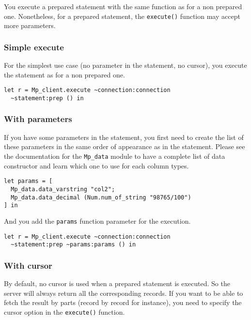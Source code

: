 \documentclass[a4paper, english, 11pt]{article}
\begin{document}
You execute a prepared statement with the same function as for a non prepared one. Nonetheless, for a prepared statement, the \texttt{execute()} function may accept more parameters.

\subsubsection{Simple execute}

For the simplest use case (no parameter in the statement, no cursor), you execute the statement as for a non prepared one.

\begin{verbatim}
let r = Mp_client.execute ~connection:connection
  ~statement:prep () in
\end{verbatim}

\subsubsection{With parameters}

If you have some parameters in the statement, you first need to create the list of these parameters in the same order of appearance as in the statement. Please see the documentation for the \texttt{Mp\_data} module to have a complete list of data constructor and learn which one to use for each column types.

\begin{verbatim}
let params = [
  Mp_data.data_varstring "col2";
  Mp_data.data_decimal (Num.num_of_string "98765/100")
] in
\end{verbatim}

And you add the \texttt{params} function parameter for the execution.

\begin{verbatim}
let r = Mp_client.execute ~connection:connection
  ~statement:prep ~params:params () in
\end{verbatim}

\subsubsection{With cursor}

By default, no cursor is used when a prepared statement is executed. So the server will always return all the corresponding records. If you want to be able to fetch the result by parts (record by record for instance), you need to specify the cursor option in the \texttt{execute()} function.
\end{document}
